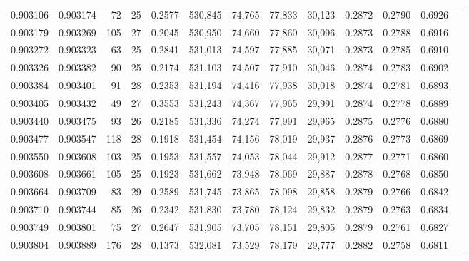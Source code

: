 \begin{tabular}{rrrrrrrrrrrrr}
0.903106 & 0.903174 &    72 &  25 &                                     0.2577 & 530,845 &  74,765 &  77,833 &  30,123 & 0.2872 & 0.2790 & 0.6926 \\
0.903179 & 0.903269 &   105 &  27 &                                     0.2045 & 530,950 &  74,660 &  77,860 &  30,096 & 0.2873 & 0.2788 & 0.6916 \\
0.903272 & 0.903323 &    63 &  25 &                                     0.2841 & 531,013 &  74,597 &  77,885 &  30,071 & 0.2873 & 0.2785 & 0.6910 \\
0.903326 & 0.903382 &    90 &  25 &                                     0.2174 & 531,103 &  74,507 &  77,910 &  30,046 & 0.2874 & 0.2783 & 0.6902 \\
0.903384 & 0.903401 &    91 &  28 &                                     0.2353 & 531,194 &  74,416 &  77,938 &  30,018 & 0.2874 & 0.2781 & 0.6893 \\
0.903405 & 0.903432 &    49 &  27 &                                     0.3553 & 531,243 &  74,367 &  77,965 &  29,991 & 0.2874 & 0.2778 & 0.6889 \\
0.903440 & 0.903475 &    93 &  26 &                                     0.2185 & 531,336 &  74,274 &  77,991 &  29,965 & 0.2875 & 0.2776 & 0.6880 \\
0.903477 & 0.903547 &   118 &  28 &                                     0.1918 & 531,454 &  74,156 &  78,019 &  29,937 & 0.2876 & 0.2773 & 0.6869 \\
0.903550 & 0.903608 &   103 &  25 &                                     0.1953 & 531,557 &  74,053 &  78,044 &  29,912 & 0.2877 & 0.2771 & 0.6860 \\
0.903608 & 0.903661 &   105 &  25 &                                     0.1923 & 531,662 &  73,948 &  78,069 &  29,887 & 0.2878 & 0.2768 & 0.6850 \\
0.903664 & 0.903709 &    83 &  29 &                                     0.2589 & 531,745 &  73,865 &  78,098 &  29,858 & 0.2879 & 0.2766 & 0.6842 \\
0.903710 & 0.903744 &    85 &  26 &                                     0.2342 & 531,830 &  73,780 &  78,124 &  29,832 & 0.2879 & 0.2763 & 0.6834 \\
0.903749 & 0.903801 &    75 &  27 &                                     0.2647 & 531,905 &  73,705 &  78,151 &  29,805 & 0.2879 & 0.2761 & 0.6827 \\
0.903804 & 0.903889 &   176 &  28 &                                     0.1373 & 532,081 &  73,529 &  78,179 &  29,777 & 0.2882 & 0.2758 & 0.6811 \\

\end{tabular}
